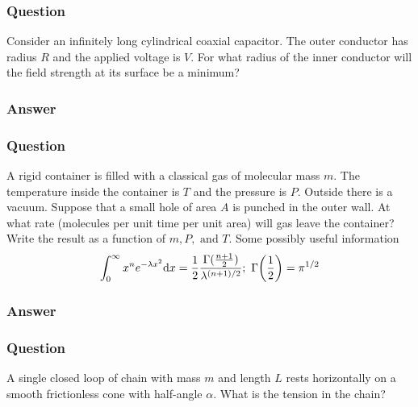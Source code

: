 \subsubsection{Question}
Consider an infinitely long cylindrical coaxial capacitor. The outer conductor has radius $R$ and the applied voltage is $V$. For what radius of the inner conductor will the field strength at its surface be a minimum?
\subsubsection{Answer}
\subsubsection{Question}
A rigid container is filled with a classical gas of molecular mass $m$. The temperature inside the container is $T$ and the pressure is $P$. Outside there is a vacuum. Suppose that a small hole of area $A$ is punched in the outer wall. At what rate (molecules per unit time per unit area) will gas leave the container? Write the result as a function of $m, P,\text{ and }T$. Some possibly useful information 
\begin{equation*}
	\int_0^\infty x^ne^{-\lambda x^2}\dd x = \frac{1}{2}\frac{\Gamma(\frac{n+1}{2})}{\lambda^{(n+1)/2}};\ \Gamma\qty(\frac{1}{2}) = \pi^{1/2}
\end{equation*}
\subsubsection{Answer}

\subsubsection{Question}

A single closed loop of chain with mass $m$ and length $L$ rests
horizontally on a smooth frictionless cone with half-angle ${\alpha}$. What is the
tension in the chain?

